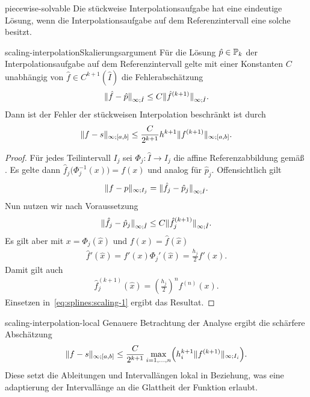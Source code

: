 \begin{Lemma}{piecewise-solvable}
  Die stückweise Interpolationsaufgabe hat eine eindeutige Lösung,
  wenn die Interpolationsaufgabe auf dem Referenzintervall eine solche
  besitzt.
\end{Lemma}

\begin{Lemma*}{scaling-interpolation}{Skalierungsargument}
  Für die Lösung $\hat p\in \P_k$ der Interpolationsaufgabe auf dem
  Referenzintervall gelte mit einer Konstanten $C$ unabhängig von
  $\hat f\in C^{k+1}(\hat I)$ die Fehlerabschätzung
  \begin{gather}
    \norm{\hat f- \hat p}_{\infty;\hat I} \le C \norm{\hat
      f^{(k+1)}}_{\infty;\hat I}.
  \end{gather}
  Dann ist der Fehler der stückweisen Interpolation beschränkt ist durch
  \begin{gather}
    \norm{f-s}_{\infty;[a,b]}
    \le \frac{C}{2^{k+1}} h^{k+1} \norm{f^{(k+1)}}_{\infty;[a,b]}.
  \end{gather}
\end{Lemma*}

\begin{proof}
  Für jedes Teilintervall $I_j$ sei $\Phi_j\colon \hat I \to I_j$ die
  affine Referenzabbildung gemäß
  . Es gelte dann
  $\hat f_j\bigl(\Phi_j^{-1}(x)\bigr) = f(x)$ und analog für $\hat
  p_j$. Offensichtlich gilt
  \begin{gather}
    \norm{ f-  p}_{\infty;I_j} = \norm{\hat f_j- \hat p_j}_{\infty;\hat I}.
  \end{gather}
  Nun nutzen wir nach Voraussetzung
  \begin{gather}
    \label{eq:splines:scaling-1}
    \norm{\hat f_j- \hat p_j}_{\infty;\hat I}
    \le C \norm{\hat f_j^{(k+1)}}_{\infty;\hat I}.
  \end{gather}
  Es gilt aber mit $x = \Phi_j(\hat x)$ und $f(x) = \hat f(\hat x)$
  \begin{gather}
    \hat f'(\hat x) = f'(x) \Phi_j'(\hat x) = \frac{h_j}{2} f'(x).
  \end{gather}
  Damit gilt auch
  \begin{gather}
    \hat f_j^{(k+1)}(\hat x) = \left(\frac{h_j}{2}\right)^n f^{(n)}(x).
  \end{gather}
  Einsetzen in~\eqref{eq:splines:scaling-1} ergibt das Resultat.
\end{proof}

\begin{Bemerkung}{scaling-interpolation-local}
  Genauere Betrachtung der Analyse ergibt die schärfere Abschätzung
  \begin{gather}
    \norm{f-s}_{\infty;[a,b]}
    \le \frac{C}{2^{k+1}} \max_{i=1,\dots,n}
    \Bigl(h_i^{k+1}\norm{f^{(k+1)}}_{\infty;I_i}\Bigr).
  \end{gather}
  Diese setzt die Ableitungen und Intervallängen lokal in Beziehung,
  was eine adaptierung der Intervallänge an die \glqq Glattheit\grqq{}
  der Funktion erlaubt.
\end{Bemerkung}

